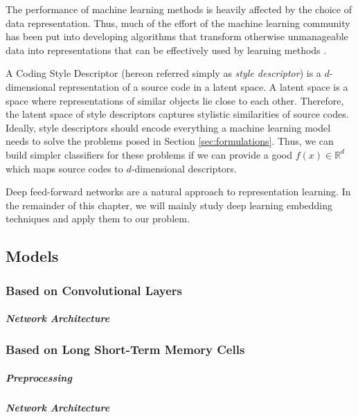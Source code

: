 The performance of machine learning methods is heavily affected by the choice of data representation. Thus, much of the effort of the machine learning community has been put into developing algorithms that transform otherwise unmanageable data into representations that can be effectively used by learning methods \cite{representation_learning}.

A Coding Style Descriptor (hereon referred simply as \textit{style descriptor}) is a $d$-dimensional representation of a source code in a latent space. A latent space is a space where representations of similar objects lie close to each other. Therefore, the latent space of style descriptors captures stylistic similarities of source codes. Ideally, style descriptors should encode everything a machine learning model needs to solve the problems posed in Section \ref{sec:formulations}. Thus, we can build simpler classifiers for these problems if we can provide a good $f(x) \in \mathbb{R}^d$ which maps source codes to $d$-dimensional descriptors.


Deep feed-forward networks are a natural approach to representation learning. In the remainder of this chapter, we will mainly study deep learning embedding techniques and apply them to our problem.

\subsection{Models}\label{sec:models}
\subsubsection{Based on Convolutional Layers}
\subparagraph*{Network Architecture}


\subsubsection{Based on Long Short-Term Memory Cells}

\subparagraph*{Preprocessing}

\subparagraph*{Network Architecture}

